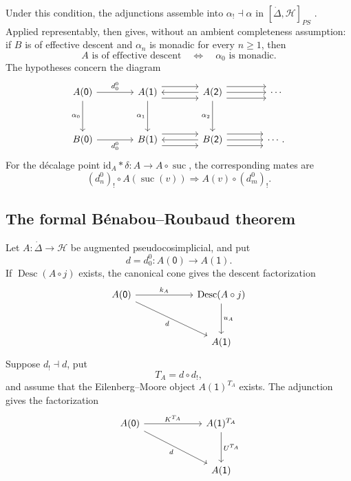 \documentclass[11pt,a4paper]{article}
\numberwithin{equation}{section}
\theoremstyle{definition}
\theoremstyle{remark}
\newcommand{\id}{\mathrm{id}}
\newcommand{\Hcat}{\mathcal H}
\newcommand{\Desc}{\operatorname{Desc}}
\newcommand{\suc}{\operatorname{suc}}
\begin{document}
Under this condition, the adjunctions assemble into
$\alpha_!\dashv\alpha$ in $[\dot\Delta,\Hcat]_{PS}$
\cite[Lemma~7.3]{Nunes2018}.
Applied representably, \cite[Theorem~7.4]{Nunes2018} then gives,
without an ambient completeness assumption:
if $B$ is of effective descent and $\alpha_n$ is monadic for every
$n\geq1$, then
\begin{equation}
  A\text{ is of effective descent}
  \quad\Longleftrightarrow\quad
  \alpha_0\text{ is monadic}.
  \label{eq:general-BR}
\end{equation}
The hypotheses concern the diagram
\[
\begin{tikzcd}[column sep=3.8em,row sep=3.2em]
 A(\mathsf0) \ar[r,"d_0^0"] \ar[d,"\alpha_0"']
 & A(\mathsf1) \ar[r,shift left=1.4ex] \ar[r,shift right=1.4ex]
     \ar[d,"\alpha_1"']
 & A(\mathsf2) \ar[l]
     \ar[r,shift left=1.4ex] \ar[r] \ar[r,shift right=1.4ex]
     \ar[d,"\alpha_2"']
 & \cdots \\
 B(\mathsf0) \ar[r,"d_0^0"']
 & B(\mathsf1) \ar[r,shift left=1.4ex] \ar[r,shift right=1.4ex]
 & B(\mathsf2) \ar[l]
     \ar[r,shift left=1.4ex] \ar[r] \ar[r,shift right=1.4ex]
 & \cdots .
\end{tikzcd}
\]
For the d\'ecalage point $\id_A\ast\delta\colon A\to A\circ\suc$,
the corresponding mates are
\begin{equation}
  (d_n^0)_!\circ A(\suc(v))
  \Longrightarrow A(v)\circ(d_m^0)_!.
  \label{eq:successor-BC}
\end{equation}

\subsection{The formal B\'enabou--Roubaud theorem}

Let $A\colon\dot\Delta\to\Hcat$ be augmented pseudocosimplicial, and
put
\[
  d=d_0^0\colon A(\mathsf 0)\longrightarrow A(\mathsf 1).
\]
If $\Desc(A\circ j)$ exists, the canonical cone gives the descent
factorization
\begin{equation}
\begin{tikzcd}[column sep=6.0em,row sep=3.2em]
  A(\mathsf 0) \ar[r,"k_A"] \ar[dr,"d"']
  & \Desc(A\circ j) \ar[d,"u_A"]
  \\
  & A(\mathsf 1)
\end{tikzcd}
\label{eq:descent-factorization}
\end{equation}
Suppose $d_!\dashv d$, put
\begin{equation}
  T_A=d\circ d_!,
  \label{eq:TA}
\end{equation}
and assume that the Eilenberg--Moore object $A(\mathsf 1)^{T_A}$ exists. The
adjunction gives the factorization
\begin{equation}
\begin{tikzcd}[column sep=6.0em,row sep=3.2em]
  A(\mathsf 0) \ar[r,"K^{T_A}"] \ar[dr,"d"']
  & A(\mathsf 1)^{T_A} \ar[d,"U^{T_A}"]
  \\
  & A(\mathsf 1)
\end{tikzcd}
\label{eq:em-factorization}
\end{equation}
\end{document}
